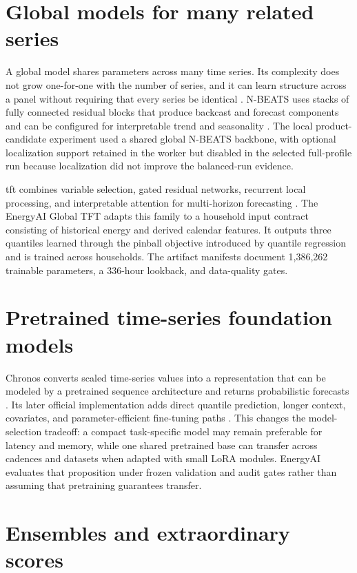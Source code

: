 \section{Global models for many related series}

A global model shares parameters across many time series. Its complexity does not grow one-for-one with the number of series, and it can learn structure across a panel without requiring that every series be identical \cite{monteromanso2021global}. N-BEATS uses stacks of fully connected residual blocks that produce backcast and forecast components and can be configured for interpretable trend and seasonality \cite{oreshkin2020nbeats}. The local product-candidate experiment used a shared global N-BEATS backbone, with optional localization support retained in the worker but disabled in the selected full-profile run because localization did not improve the balanced-run evidence.

\ac{tft} combines variable selection, gated residual networks, recurrent local processing, and interpretable attention for multi-horizon forecasting \cite{lim2021tft}. The EnergyAI Global TFT adapts this family to a household input contract consisting of historical energy and derived calendar features. It outputs three quantiles learned through the pinball objective introduced by quantile regression \cite{koenker1978quantile} and is trained across households. The artifact manifests document 1,386,262 trainable parameters, a 336-hour lookback, and data-quality gates.

\section{Pretrained time-series foundation models}

Chronos converts scaled time-series values into a representation that can be modeled by a pretrained sequence architecture and returns probabilistic forecasts \cite{ansari2024chronos}. Its later official implementation adds direct quantile prediction, longer context, covariates, and parameter-efficient fine-tuning paths \cite{chronos2repo}. This changes the model-selection tradeoff: a compact task-specific model may remain preferable for latency and memory, while one shared pretrained base can transfer across cadences and datasets when adapted with small LoRA modules. EnergyAI evaluates that proposition under frozen validation and audit gates rather than assuming that pretraining guarantees transfer.

\section{Ensembles and extraordinary scores}

